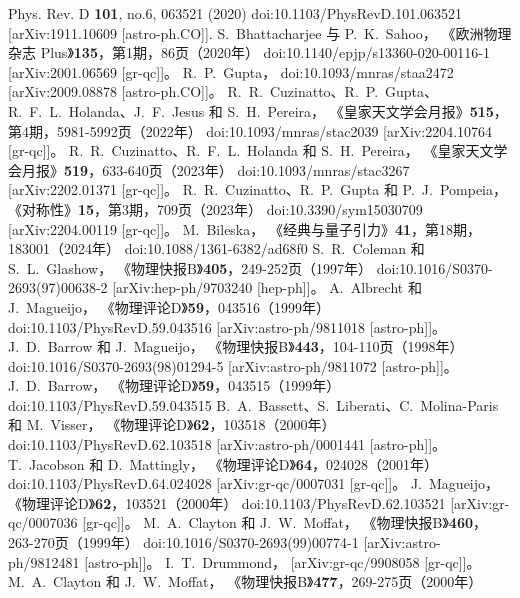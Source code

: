 \documentclass[jkps,preprint,fleqn]{revtex4}
\begin{document}
\begin{thebibliography}{999}
Phys. Rev. D \textbf{101}, no.6, 063521 (2020)
doi:10.1103/PhysRevD.101.063521
[arXiv:1911.10609 [astro-ph.CO]].
S.~Bhattacharjee 与 P.~K.~Sahoo，
《欧洲物理杂志 Plus》\textbf{135}，第1期，86页（2020年）
doi:10.1140/epjp/s13360-020-00116-1
[arXiv:2001.06569 [gr-qc]]。
R.~P.~Gupta，
doi:10.1093/mnras/staa2472
[arXiv:2009.08878 [astro-ph.CO]]。
R.~R.~Cuzinatto、R.~P.~Gupta、R.~F.~L.~Holanda、J.~F.~Jesus 和 S.~H.~Pereira，
《皇家天文学会月报》\textbf{515}，第4期，5981-5992页（2022年）
doi:10.1093/mnras/stac2039
[arXiv:2204.10764 [gr-qc]]。
R.~R.~Cuzinatto、R.~F.~L.~Holanda 和 S.~H.~Pereira，
《皇家天文学会月报》\textbf{519}，633-640页（2023年）
doi:10.1093/mnras/stac3267
[arXiv:2202.01371 [gr-qc]]。
R.~R.~Cuzinatto、R.~P.~Gupta 和 P.~J.~Pompeia，
《对称性》\textbf{15}，第3期，709页（2023年）
doi:10.3390/sym15030709
[arXiv:2204.00119 [gr-qc]]。
M.~Bileska，
《经典与量子引力》\textbf{41}，第18期，183001（2024年）
doi:10.1088/1361-6382/ad68f0
S.~R.~Coleman 和 S.~L.~Glashow，
《物理快报B》\textbf{405}，249-252页（1997年）
doi:10.1016/S0370-2693(97)00638-2
[arXiv:hep-ph/9703240 [hep-ph]]。
A.~Albrecht 和 J.~Magueijo，
《物理评论D》\textbf{59}，043516（1999年）
doi:10.1103/PhysRevD.59.043516
[arXiv:astro-ph/9811018 [astro-ph]]。
J.~D.~Barrow 和 J.~Magueijo，
《物理快报B》\textbf{443}，104-110页（1998年）
doi:10.1016/S0370-2693(98)01294-5
[arXiv:astro-ph/9811072 [astro-ph]]。
J.~D.~Barrow，
《物理评论D》\textbf{59}，043515（1999年）
doi:10.1103/PhysRevD.59.043515
B.~A.~Bassett、S.~Liberati、C.~Molina-Paris 和 M.~Visser，
《物理评论D》\textbf{62}，103518（2000年）
doi:10.1103/PhysRevD.62.103518
[arXiv:astro-ph/0001441 [astro-ph]]。
T.~Jacobson 和 D.~Mattingly，
《物理评论D》\textbf{64}，024028（2001年）
doi:10.1103/PhysRevD.64.024028
[arXiv:gr-qc/0007031 [gr-qc]]。
J.~Magueijo，
《物理评论D》\textbf{62}，103521（2000年）
doi:10.1103/PhysRevD.62.103521
[arXiv:gr-qc/0007036 [gr-qc]]。
M.~A.~Clayton 和 J.~W.~Moffat，
《物理快报B》\textbf{460}，263-270页（1999年）
doi:10.1016/S0370-2693(99)00774-1
[arXiv:astro-ph/9812481 [astro-ph]]。
I.~T.~Drummond，
[arXiv:gr-qc/9908058 [gr-qc]]。
M.~A.~Clayton 和 J.~W.~Moffat，
《物理快报B》\textbf{477}，269-275页（2000年）

\end{thebibliography}
\end{document}
